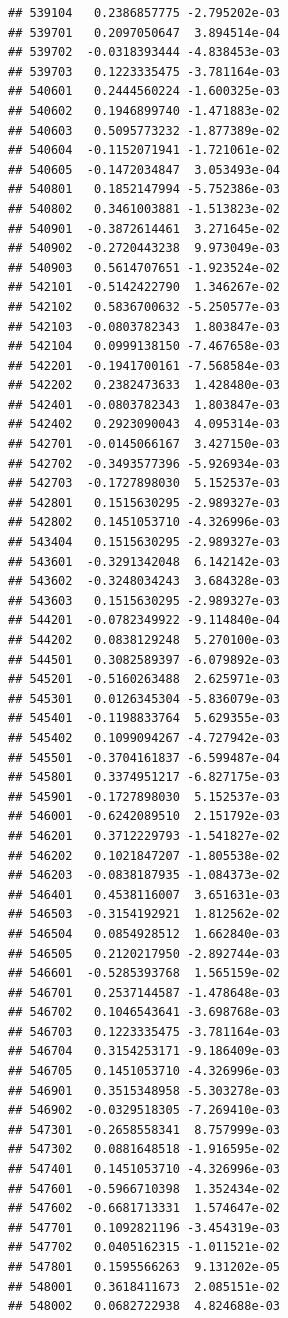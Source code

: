 \documentclass[ignorenonframetext,]{beamer}
\begin{document}
\begin{frame}[fragile]
\begin{verbatim}
## 539104   0.2386857775 -2.795202e-03
## 539701   0.2097050647  3.894514e-04
## 539702  -0.0318393444 -4.838453e-03
## 539703   0.1223335475 -3.781164e-03
## 540601   0.2444560224 -1.600325e-03
## 540602   0.1946899740 -1.471883e-02
## 540603   0.5095773232 -1.877389e-02
## 540604  -0.1152071941 -1.721061e-02
## 540605  -0.1472034847  3.053493e-04
## 540801   0.1852147994 -5.752386e-03
## 540802   0.3461003881 -1.513823e-02
## 540901  -0.3872614461  3.271645e-02
## 540902  -0.2720443238  9.973049e-03
## 540903   0.5614707651 -1.923524e-02
## 542101  -0.5142422790  1.346267e-02
## 542102   0.5836700632 -5.250577e-03
## 542103  -0.0803782343  1.803847e-03
## 542104   0.0999138150 -7.467658e-03
## 542201  -0.1941700161 -7.568584e-03
## 542202   0.2382473633  1.428480e-03
## 542401  -0.0803782343  1.803847e-03
## 542402   0.2923090043  4.095314e-03
## 542701  -0.0145066167  3.427150e-03
## 542702  -0.3493577396 -5.926934e-03
## 542703  -0.1727898030  5.152537e-03
## 542801   0.1515630295 -2.989327e-03
## 542802   0.1451053710 -4.326996e-03
## 543404   0.1515630295 -2.989327e-03
## 543601  -0.3291342048  6.142142e-03
## 543602  -0.3248034243  3.684328e-03
## 543603   0.1515630295 -2.989327e-03
## 544201  -0.0782349922 -9.114840e-04
## 544202   0.0838129248  5.270100e-03
## 544501   0.3082589397 -6.079892e-03
## 545201  -0.5160263488  2.625971e-03
## 545301   0.0126345304 -5.836079e-03
## 545401  -0.1198833764  5.629355e-03
## 545402   0.1099094267 -4.727942e-03
## 545501  -0.3704161837 -6.599487e-04
## 545801   0.3374951217 -6.827175e-03
## 545901  -0.1727898030  5.152537e-03
## 546001  -0.6242089510  2.151792e-03
## 546201   0.3712229793 -1.541827e-02
## 546202   0.1021847207 -1.805538e-02
## 546203  -0.0838187935 -1.084373e-02
## 546401   0.4538116007  3.651631e-03
## 546503  -0.3154192921  1.812562e-02
## 546504   0.0854928512  1.662840e-03
## 546505   0.2120217950 -2.892744e-03
## 546601  -0.5285393768  1.565159e-02
## 546701   0.2537144587 -1.478648e-03
## 546702   0.1046543641 -3.698768e-03
## 546703   0.1223335475 -3.781164e-03
## 546704   0.3154253171 -9.186409e-03
## 546705   0.1451053710 -4.326996e-03
## 546901   0.3515348958 -5.303278e-03
## 546902  -0.0329518305 -7.269410e-03
## 547301  -0.2658558341  8.757999e-03
## 547302   0.0881648518 -1.916595e-02
## 547401   0.1451053710 -4.326996e-03
## 547601  -0.5966710398  1.352434e-02
## 547602  -0.6681713331  1.574647e-02
## 547701   0.1092821196 -3.454319e-03
## 547702   0.0405162315 -1.011521e-02
## 547801   0.1595566263  9.131202e-05
## 548001   0.3618411673  2.085151e-02
## 548002   0.0682722938  4.824688e-03

\end{verbatim}
\end{frame}
\end{document}
